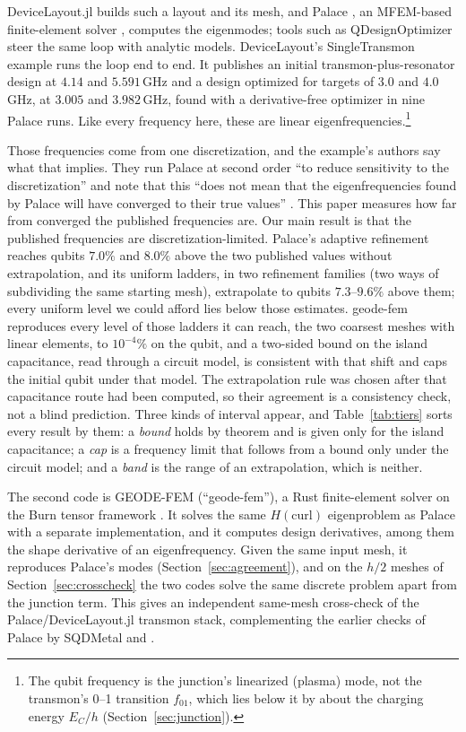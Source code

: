 \documentclass{anvil-paper}
\begin{document}
DeviceLayout.jl \citep{devicelayout} builds such a layout and its mesh, and
Palace \citep{palace}, an MFEM-based finite-element solver \citep{mfem},
computes the eigenmodes; tools such as QDesignOptimizer
\citep{eriksson2025automated} steer the same loop with analytic models.
DeviceLayout's SingleTransmon example
\citep{devicelayout-blog,devicelayout-example} runs the loop end to end. It
publishes an initial transmon-plus-resonator design at $4.14$ and
$5.591$\,GHz and a design optimized for targets of $3.0$ and $4.0$\,GHz, at
$3.005$ and $3.982$\,GHz, found with a derivative-free optimizer in nine
Palace runs. Like every frequency here, these are linear
eigenfrequencies.\footnote{The qubit frequency is the junction's
linearized (plasma) mode, not the transmon's 0--1 transition $f_{01}$,
which lies below it by about the charging energy $E_C/h$
(Section~\ref{sec:junction}).}

Those frequencies come from one discretization, and the example's authors
say what that implies. They run Palace at second order ``to reduce
sensitivity to the discretization'' and note that this ``does not mean that
the eigenfrequencies found by Palace will have converged to their true
values'' \citep{devicelayout-example}. This paper measures
how far from converged the published frequencies are. Our
main result is that the published frequencies are discretization-limited.
Palace's adaptive refinement reaches qubits $7.0\%$ and $8.0\%$ above the
two published values without extrapolation, and its uniform ladders, in two
refinement families (two ways of subdividing the same starting mesh),
extrapolate to qubits $7.3$--$9.6\%$ above them;
every uniform level we could afford lies below those estimates. geode-fem
reproduces every level of those ladders it can reach, the two coarsest
meshes with linear elements, to $10^{-4}\%$ on the qubit, and a
two-sided bound on the island capacitance, read through a circuit model, is
consistent with that shift and caps the initial qubit under that model.
The extrapolation rule was chosen after that capacitance route had been
computed, so their agreement is a consistency check, not a blind prediction.
Three kinds of interval appear, and Table~\ref{tab:tiers} sorts every
result by them: a \emph{bound} holds by theorem and is given only for the
island capacitance; a \emph{cap} is a frequency limit that follows from
a bound only under the circuit model; and a \emph{band} is the range of
an extrapolation, which is neither.

The second code is GEODE-FEM (``geode-fem''), a Rust finite-element solver
on the Burn tensor framework \citep{burn}. It solves the same
$H(\mathrm{curl})$ eigenproblem as Palace with a separate implementation,
and it computes design derivatives, among them the shape derivative of an
eigenfrequency. Given the same input mesh, it reproduces Palace's modes
(Section~\ref{sec:agreement}), and on the $h/2$ meshes of
Section~\ref{sec:crosscheck} the two codes solve the same discrete problem
apart from the junction term. This gives an independent
same-mesh cross-check of the Palace/DeviceLayout.jl transmon stack,
complementing the earlier checks of Palace by SQDMetal
\citep{sommers2025open} and \citet{ye2025electromagnetic}.
\end{document}
